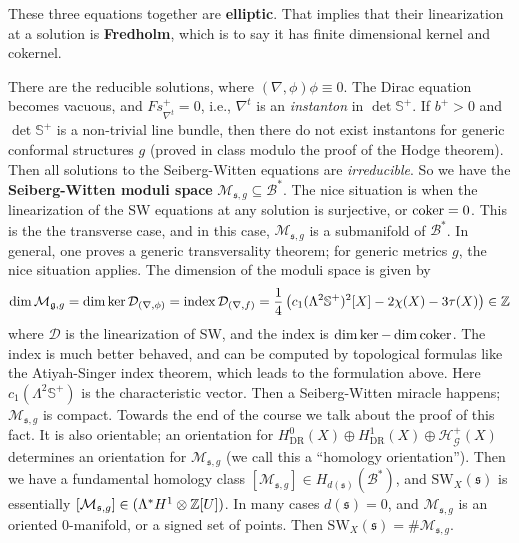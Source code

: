 These three equations together are \textbf{elliptic}. That implies that their linearization at a solution is \textbf{Fredholm}, which is to say it has finite dimensional kernel and cokernel. 

There are the reducible solutions, where $(\nabla,\phi)\phi\equiv 0$. The Dirac equation becomes vacuous, and $Fs_{\nabla^t}^+ = 0$, i.e., $\nabla^t$ is an \emph{instanton} in $\det \mathbb S^+$. If $b^+ > 0$ and $\det \mathbb S^+$ is a non-trivial line bundle, then there do not exist instantons for generic conformal structures $g$ (proved in class modulo the proof of the Hodge theorem). Then all solutions to the Seiberg-Witten equations are \emph{irreducible}. So we have the \textbf{Seiberg-Witten moduli space} $\mathcal M _{\mathfrak s, g}\subseteq \mathcal B^*$. The nice situation is when the linearization of the SW equations at any solution is surjective, or $\operatorname{coker} = 0$. This is the the transverse case, and in this case, $\mathcal M _{\mathfrak s, g}$ is a submanifold of $\mathcal B^*$. In general, one proves a generic transversality theorem; for generic metrics $g$, the nice situation applies. The dimension of the moduli space is given by \[
    \dim \mathcal M_{\mathfrak g, g}= \dim \ker \mathcal D_{(\nabla,\phi)} = \operatorname{index}\mathcal D_{(\nabla,f)} = \frac{1}{4}\left( c_1(\Lambda^2 \mathbb S^+) ^2[X] - 2\chi(X) - 3 \tau(X) \right)  \in \mathbb{Z}
\]where $\mathcal D$ is the linearization of SW, and the index is $\dim \ker - \dim \operatorname{coker}$. The index is much better behaved, and can be computed by topological formulas like the Atiyah-Singer index theorem, which leads to the formulation above. Here $c_1(\Lambda^2\mathbb S^+)$ is the characteristic vector. Then a Seiberg-Witten miracle happens; $\mathcal M _{\mathfrak s, g}$ is compact. Towards the end of the course we talk about the proof of this fact. It is also orientable; an orientation for $H^0 _{\mathrm{DR}}(X) \oplus H^1_{\mathrm{DR}}(X) \oplus \mathcal H^+_{\mathcal G}(X)$ determines an orientation for $\mathcal M _{\mathfrak s,g}$ (we call this a ``homology orientation''). Then we have a fundamental homology class $[\mathcal M_{\mathfrak s, g}] \in H_{d(\mathfrak s)}(\mathcal B^*)$, and $\mathrm{SW}_X(\mathfrak s)$ is essentially $[\mathcal M_{\mathfrak s,g}] \in  (\Lambda^* H^1\otimes \mathbb{Z}[U])$. In many cases $d(\mathfrak s) = 0$, and $\mathcal M _{\mathfrak s, g}$ is an oriented 0-manifold, or a signed set of points. Then $\mathrm{SW}_X(\mathfrak s) = \# \mathcal M_{\mathfrak s, g}$.


